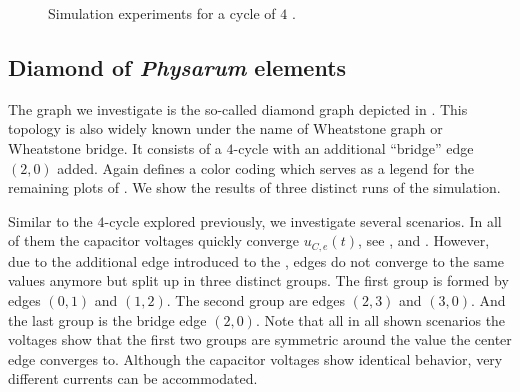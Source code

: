 		\begin{figure}
			\centering
			\qquad
			\newline
			\qquad
			\newline
			\qquad
			\newline
			\qquad
			
			\caption[Cycle simulations]{Simulation experiments for a cycle of $4$ \Pes.}
			\label{fig:cycle}
		\end{figure}

	\subsection{Diamond of \emph{Physarum} elements}

		The graph we investigate is the so-called diamond graph depicted in . This topology is also widely known under the name of Wheatstone graph or Wheatstone bridge. It consists of a $4$-cycle with an additional ``bridge'' edge $(2,0)$ added. Again  defines a color coding which serves as a legend for the remaining plots of . We show the results of three distinct runs of the simulation.

		Similar to the $4$-cycle explored previously, we investigate several scenarios. In all of them the capacitor voltages quickly converge $u_{C,e}(t)$, see ,  and . However, due to the additional edge introduced to the \Pn, edges do not converge to the same values anymore but split up in three distinct groups. The first group is formed by edges $(0,1)$ and $(1,2)$. The second group are edges $(2,3)$ and $(3,0)$. And the last group is the bridge edge $(2,0)$. Note that all in all shown scenarios the voltages show that the first two groups are symmetric around the value the center edge converges to. Although the capacitor voltages show identical behavior, very different currents can be accommodated.

